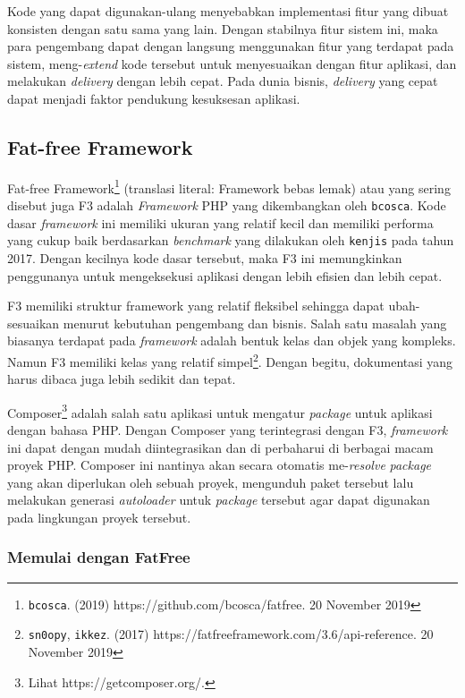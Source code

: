     Kode yang dapat digunakan-ulang menyebabkan implementasi fitur yang dibuat konsisten dengan satu sama yang lain.
    Dengan stabilnya fitur sistem ini, maka para pengembang dapat dengan langsung menggunakan fitur yang terdapat pada sistem, meng-\textit{extend} kode tersebut untuk menyesuaikan dengan fitur aplikasi, dan melakukan \textit{delivery} dengan lebih cepat.
    Pada dunia bisnis, \textit{delivery} yang cepat dapat menjadi faktor pendukung kesuksesan aplikasi.

\subsection{Fat-free Framework}
    Fat-free Framework\footnote{\texttt{bcosca}. (2019) https://github.com/bcosca/fatfree. 20 November 2019} (translasi literal: Framework bebas lemak) atau yang sering disebut juga F3 adalah \textit{Framework} PHP yang dikembangkan oleh \texttt{bcosca}. Kode dasar \textit{framework} ini memiliki ukuran yang relatif kecil dan memiliki performa yang cukup baik berdasarkan \textit{benchmark} yang dilakukan oleh \texttt{kenjis} pada tahun 2017\cite{kenjis:framework-benchmark}. Dengan kecilnya kode dasar tersebut, maka F3 ini memungkinkan penggunanya untuk mengeksekusi aplikasi dengan lebih efisien dan lebih cepat.
    
    F3 memiliki struktur framework yang relatif fleksibel sehingga dapat ubah-sesuaikan menurut kebutuhan pengembang dan bisnis.
    Salah satu masalah yang biasanya terdapat pada \textit{framework} adalah bentuk kelas dan objek yang kompleks.
    Namun F3 memiliki kelas yang relatif simpel\footnote{\texttt{sn0opy}, \texttt{ikkez}. (2017) https://fatfreeframework.com/3.6/api-reference. 20 November 2019}.
    Dengan begitu, dokumentasi yang harus dibaca juga lebih sedikit dan tepat.
    
    Composer\footnote{Lihat https://getcomposer.org/.} adalah salah satu aplikasi untuk mengatur \textit{package} untuk aplikasi dengan bahasa PHP.
    Dengan Composer yang terintegrasi dengan F3, \textit{framework} ini dapat dengan mudah diintegrasikan dan di perbaharui di berbagai macam proyek PHP.  Composer ini nantinya akan secara otomatis me-\textit{resolve} \textit{package} yang akan diperlukan oleh sebuah proyek, mengunduh paket tersebut lalu melakukan generasi \textit{autoloader} untuk \textit{package} tersebut agar dapat digunakan pada lingkungan proyek tersebut.

    \subsubsection{Memulai dengan FatFree}
    
